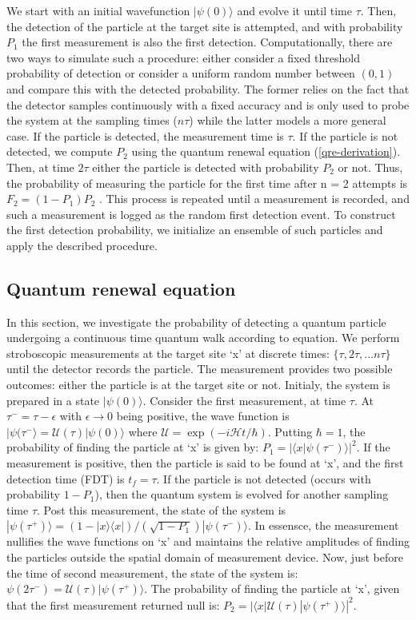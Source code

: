 \documentclass{article}
\begin{document}
We start with an initial wavefunction $|\psi (0)\rangle$ and evolve it until time $\tau$. Then, the detection of the particle at the target site is attempted, and with probability $P_1$ the first measurement is also the first detection. Computationally, there are two ways to simulate such a procedure: either consider a fixed threshold probability of detection or consider a uniform random number between $(0,1)$ and compare this with the detected probability. The former relies on the fact that the detector samples continuously with a fixed accuracy and is only used to probe the system at the sampling times ($n\tau$) while the latter models a more general case. If the particle is detected, the measurement time is $\tau$. If the particle is not detected, we compute $P_2$ using the quantum renewal equation (\ref{qre-derivation}). Then, at time $2\tau$ either the particle is detected with probability $P_2$ or not.  Thus, the probability of measuring the particle for the first time after n = 2 attempts is $F_2 = (1 - P_1 )P_2$ . This process is repeated until a measurement is recorded, and such a measurement is logged as the random first detection event. To construct the first detection probability, we initialize an ensemble of such particles and apply the described procedure. 

\subsection{Quantum renewal equation}

In this section, we investigate the probability of detecting a quantum particle undergoing a continuous time quantum walk according to equation. We perform stroboscopic measurements at the target site `x' at discrete times: $\{\tau, 2\tau, ... n\tau \}$ until the detector records the particle. The measurement provides two possible outcomes: either the particle is at the target site or not. Initialy, the system is prepared in a state $| \psi(0) \rangle$. Consider the first measurement, at time $\tau$. At $\tau ^- = \tau - \epsilon$ with $\epsilon \rightarrow 0$ being positive, the wave function is $| \psi(\tau^{-}\rangle = \mathcal{U}(\tau)|\psi(0)\rangle$ where $\mathcal{U} = \exp(-i\mathcal{H}t/\hbar)$. Putting $\hbar =1$, the probability of finding the particle at `x' is given by: $P_1 = |\langle x | \psi(\tau^{-})\rangle|^2$. If the measurement is positive, then the particle is said to be found at `x', and the first detection time (FDT) is $t_f=\tau$. If the particle is not detected (occurs with probability $1-P_1$), then the quantum system is evolved for another sampling time $\tau$. Post this measurement, the state of the system is $|\psi(\tau^{+})\rangle = (1 - |x\rangle\langle x|)/(\sqrt{1-P_1}) |\psi(\tau^{-})\rangle$. In essensce,  the measurement nullifies the wave functions on `x' and maintains the relative amplitudes of finding the particles outside the spatial domain of measurement device. Now, just before the time of second measurement, the state of the system is: $\psi(2\tau^{-}) = \mathcal{U}(\tau)|\psi(\tau^{+})\rangle$. The probability of finding the particle at `x', given that the first measurement returned null is: $P_2 = |\langle x | \mathcal{U}(\tau)| \psi(\tau^{+})\rangle|^2$. 
\end{document}
